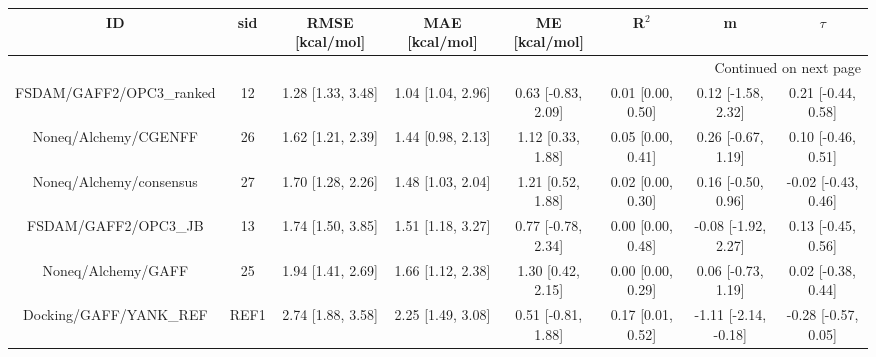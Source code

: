 \documentclass[8pt]{article}
\begin{document}
\begin{center}
\begin{footnotesize}
\begin{longtable}{|cccccccc|}
\toprule
                       ID &   sid &    RMSE [kcal/mol] &     MAE [kcal/mol] &       ME [kcal/mol] &              R$^2$ &                     m &               $\tau$ \\
\midrule
\endhead
\midrule
\multicolumn{8}{r}{{Continued on next page}} \\
\midrule
\endfoot

\bottomrule
\endlastfoot
 FSDAM/GAFF2/OPC3\_ranked &    12 &  1.28 [1.33, 3.48] &  1.04 [1.04, 2.96] &  0.63 [-0.83, 2.09] &  0.01 [0.00, 0.50] &    0.12 [-1.58, 2.32] &   0.21 [-0.44, 0.58] \\
     Noneq/Alchemy/CGENFF &    26 &  1.62 [1.21, 2.39] &  1.44 [0.98, 2.13] &   1.12 [0.33, 1.88] &  0.05 [0.00, 0.41] &    0.26 [-0.67, 1.19] &   0.10 [-0.46, 0.51] \\
  Noneq/Alchemy/consensus &    27 &  1.70 [1.28, 2.26] &  1.48 [1.03, 2.04] &   1.21 [0.52, 1.88] &  0.02 [0.00, 0.30] &    0.16 [-0.50, 0.96] &  -0.02 [-0.43, 0.46] \\
     FSDAM/GAFF2/OPC3\_JB &    13 &  1.74 [1.50, 3.85] &  1.51 [1.18, 3.27] &  0.77 [-0.78, 2.34] &  0.00 [0.00, 0.48] &   -0.08 [-1.92, 2.27] &   0.13 [-0.45, 0.56] \\
       Noneq/Alchemy/GAFF &    25 &  1.94 [1.41, 2.69] &  1.66 [1.12, 2.38] &   1.30 [0.42, 2.15] &  0.00 [0.00, 0.29] &    0.06 [-0.73, 1.19] &   0.02 [-0.38, 0.44] \\
   Docking/GAFF/YANK\_REF &  REF1 &  2.74 [1.88, 3.58] &  2.25 [1.49, 3.08] &  0.51 [-0.81, 1.88] &  0.17 [0.01, 0.52] &  -1.11 [-2.14, -0.18] &  -0.28 [-0.57, 0.05] \\
\end{longtable}
\end{footnotesize}
\end{center}
\end{document}
